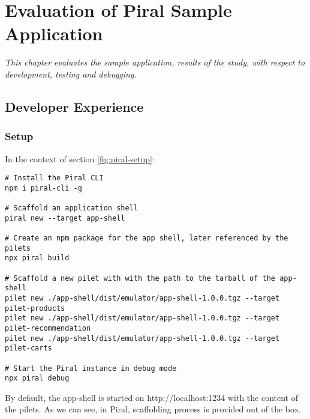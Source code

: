 \documentclass[a4paper]{book}
\begin{document}

\chapter{Evaluation of Piral Sample Application} \label{Evaluation of Piral Sample Application}
\textit{This chapter evaluates the sample application, results of the study, with respect to development, testing and debugging.}
\section{Developer Experience}
\subsection{Setup}
In the context of section \ref{fig:piral-setup}:
\begin{lstlisting}[caption={Complete setup with Piral}]
# Install the Piral CLI
npm i piral-cli -g

# Scaffold an application shell
piral new --target app-shell

# Create an npm package for the app shell, later referenced by the pilets
npx piral build

# Scaffold a new pilet with with the path to the tarball of the app-shell
pilet new ./app-shell/dist/emulator/app-shell-1.0.0.tgz --target pilet-products
pilet new ./app-shell/dist/emulator/app-shell-1.0.0.tgz --target pilet-recommendation
pilet new ./app-shell/dist/emulator/app-shell-1.0.0.tgz --target pilet-carts

# Start the Piral instance in debug mode
npx piral debug
\end{lstlisting}
By default, the app-shell is started on http://localhost:1234 with the content of the pilets. As we can see, in Piral, scaffolding process is provided out of the box.
\end{document}
